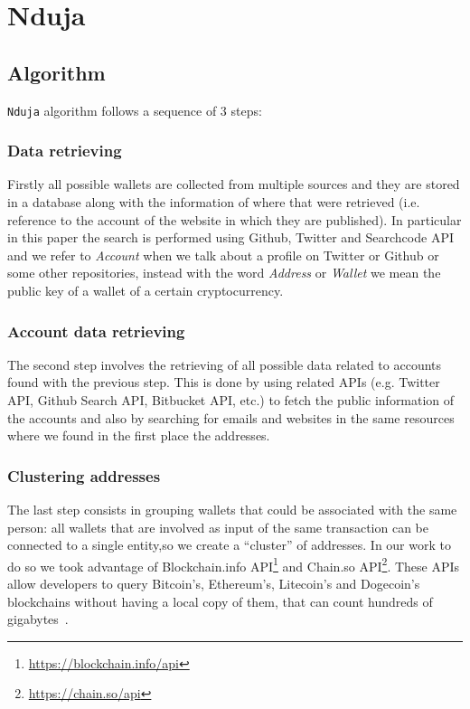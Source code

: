 \newcommand{\walletcollector}{\texttt{wallet\_collector}}
\newcommand{\userinforetriever}{\texttt{user\_info\_retriever}}
\newcommand{\addresschecker}{\texttt{address\_checker}}
\newcommand{\graph}{\texttt{graph}}

\section{Nduja} \label{nduja}

\subsection{Algorithm}
\texttt{Nduja} algorithm follows a sequence of 3 steps:
\subsubsection*{Data retrieving} Firstly all possible wallets are collected
from multiple sources and they are stored in a database along with the
information of where that were retrieved (i.e. reference to the account of the
website in which they are published). In particular in this paper the search is
performed using Github, Twitter and Searchcode API and we refer to
\textit{Account} when we talk about a profile on Twitter or Github or some other
repositories, instead with the word \textit{Address} or \textit{Wallet} we mean
the public key of a wallet of a certain cryptocurrency.

\subsubsection*{Account data retrieving} The second step involves the
retrieving of all possible data related to accounts found with the previous
step. This is done by using related APIs (e.g. Twitter API, Github Search API,
Bitbucket API, etc.) to fetch the public information of the accounts and also
by searching for emails and websites in the same resources where we found in
the first place the addresses.

\subsubsection*{Clustering addresses} The last step consists in grouping
wallets that could be associated with the same person: all wallets that are
involved as input of the same transaction can be connected to a single
entity,so we create a ``cluster'' of addresses. In our work to do so we
took advantage of
Blockchain.info API\footnote{\url{https://blockchain.info/api}} and
Chain.so API\footnote{\url{https://chain.so/api}}. These APIs allow
developers to query Bitcoin's, Ethereum's, Litecoin's and Dogecoin's
blockchains without having a local copy of them, that can count
hundreds of gigabytes~\cite{bib:bitinfochart}.

